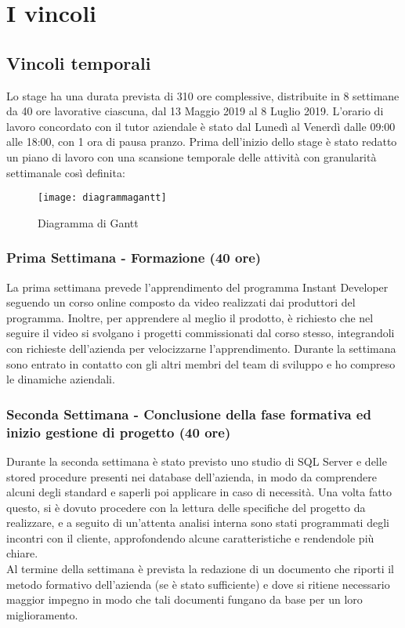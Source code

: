 \section{I vincoli}
\subsection{Vincoli temporali}
Lo stage ha una durata prevista di 310 ore complessive, distribuite in 8 settimane da 40 ore lavorative ciascuna, dal 13 Maggio 2019 al 8 Luglio 2019. L'orario di lavoro concordato con il tutor aziendale è stato dal Lunedì al Venerdì dalle 09:00 alle 18:00, con 1 ora di pausa pranzo. Prima dell'inizio dello stage è stato redatto un piano di lavoro con una scansione temporale delle attività con granularità settimanale così definita:


\begin{figure}[!h] 
	\centering 
	\texttt{[image: diagrammagantt]} 
	\caption{Diagramma di Gantt}
	\label{Gantt}
\end{figure}


\subsubsection*{Prima Settimana - Formazione (40 ore)}
La prima settimana prevede l'apprendimento del programma Instant Developer seguendo un corso online composto da video realizzati dai produttori del programma. Inoltre, per apprendere al meglio il prodotto, è richiesto che nel seguire il video si svolgano i progetti commissionati dal corso stesso, integrandoli con richieste dell'azienda per velocizzarne l'apprendimento. 
Durante la settimana sono entrato in contatto con gli altri membri del team di sviluppo e ho compreso le dinamiche aziendali.

\subsubsection*{Seconda Settimana - Conclusione della fase formativa ed inizio gestione di progetto (40 ore)}
Durante la seconda settimana è stato previsto uno studio di SQL Server e delle stored procedure presenti nei database dell'azienda, in modo da comprendere alcuni degli standard e saperli poi applicare in caso di necessità. Una volta fatto questo, si è dovuto procedere con la lettura delle specifiche del progetto da realizzare, e a seguito di un'attenta analisi interna sono stati programmati degli incontri con il cliente, approfondendo alcune caratteristiche e rendendole più chiare. \\
Al termine della settimana è prevista la redazione di un documento che riporti il metodo formativo dell'azienda (se è stato sufficiente) e dove si ritiene necessario maggior impegno in modo che tali documenti fungano da base per un loro miglioramento.

